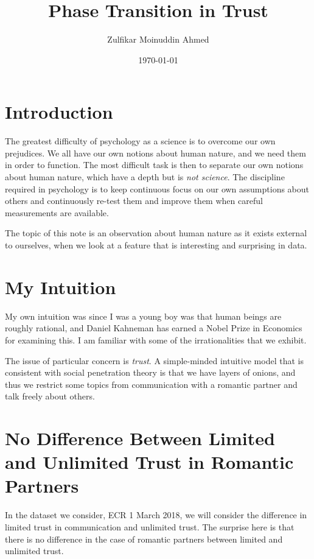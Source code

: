 \documentclass{amsart}
\title{Phase Transition in Trust}
\author{Zulfikar Moinuddin Ahmed}
\date{\today}
\begin{document}
\maketitle

\section{Introduction}
The greatest difficulty of psychology as a science is to overcome our own prejudices.  We all have our own notions about human nature, and we need them in order to function.  The most difficult task is then to separate 
our own notions about human nature, which have a depth but is {\em not science}.  The discipline required in psychology is to keep continuous focus on our own assumptions about others and continuously re-test them and improve them when careful measurements are available.  

The topic of this note is an observation about human nature as it exists external to ourselves, when we look at a feature that is interesting and surprising in data.  

\section{My Intuition} 
My own intuition was since I was a young boy was that human beings are roughly rational, and Daniel Kahneman has earned a Nobel Prize in Economics for examining this.  I am familiar with some of the irrationalities that we exhibit.

The issue of particular concern is {\em trust}.  A simple-minded intuitive model that is consistent with social penetration theory is that we have layers of onions, and thus we restrict some topics from communication with a romantic partner and talk freely about others.

\section{No Difference Between Limited and Unlimited Trust in Romantic Partners}

In the dataset we consider, ECR 1 March 2018, we will consider the difference in limited trust in communication and unlimited trust.  The surprise here is that there is no difference in the case of romantic partners between limited and unlimited trust.
\end{document}
